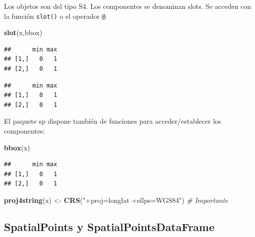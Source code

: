 \documentclass[
]{book}
\newenvironment{Shaded}{\begin{snugshade}}{\end{snugshade}}
\newcommand{\CommentTok}[1]{\textcolor[rgb]{0.56,0.35,0.01}{\textit{#1}}}
\newcommand{\DocumentationTok}[1]{\textcolor[rgb]{0.56,0.35,0.01}{\textbf{\textit{#1}}}}
\newcommand{\FunctionTok}[1]{\textcolor[rgb]{0.13,0.29,0.53}{\textbf{#1}}}
\newcommand{\NormalTok}[1]{#1}
\newcommand{\OtherTok}[1]{\textcolor[rgb]{0.56,0.35,0.01}{#1}}
\newcommand{\SpecialCharTok}[1]{\textcolor[rgb]{0.81,0.36,0.00}{\textbf{#1}}}
\newcommand{\StringTok}[1]{\textcolor[rgb]{0.31,0.60,0.02}{#1}}
\theoremstyle{break}
\theoremstyle{definition}
\theoremstyle{definition}
\theoremstyle{definition}
\theoremstyle{definition}
\theoremstyle{remark}
\begin{document}
Los objetos son del tipo S4.
Los componentes se denominan slots.
Se acceden con la función \texttt{slot()} o el operador \texttt{@}.

\begin{Shaded}
\begin{Highlighting}[]
\FunctionTok{slot}\NormalTok{(x,}\StringTok{\textquotesingle{}bbox\textquotesingle{}}\NormalTok{)}
\end{Highlighting}
\end{Shaded}

\begin{verbatim}
##      min max
## [1,]   0   1
## [2,]   0   1
\end{verbatim}

\begin{Shaded}
\end{Shaded}

\begin{verbatim}
##      min max
## [1,]   0   1
## [2,]   0   1
\end{verbatim}

El paquete sp dispone también de funciones para acceder/establecer
los componentes:

\begin{Shaded}
\begin{Highlighting}[]
\FunctionTok{bbox}\NormalTok{(x)}
\end{Highlighting}
\end{Shaded}

\begin{verbatim}
##      min max
## [1,]   0   1
## [2,]   0   1
\end{verbatim}

\begin{Shaded}
\begin{Highlighting}[]
\FunctionTok{proj4string}\NormalTok{(x) }\OtherTok{\textless{}{-}} \FunctionTok{CRS}\NormalTok{(}\StringTok{"+proj=longlat +ellps=WGS84"}\NormalTok{) }\CommentTok{\# Importante}
\end{Highlighting}
\end{Shaded}

\subsection{SpatialPoints y SpatialPointsDataFrame}\label{spatialpoints-y-spatialpointsdataframe}
\end{document}
